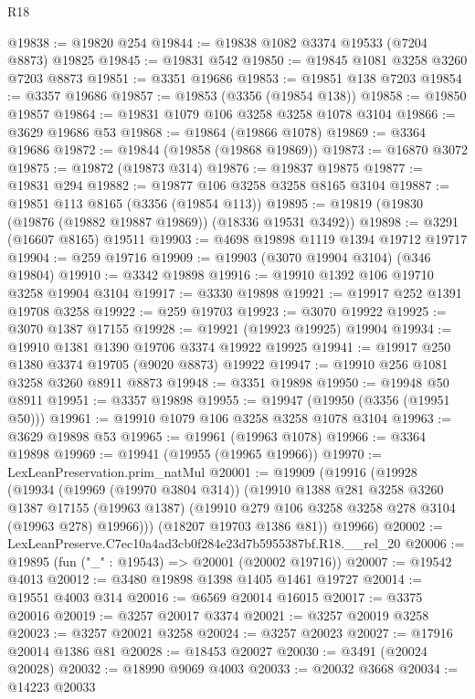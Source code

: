 \begin{lexlean}{R18}
\begin{coremodule}
@19838 := @19820 @254
@19844 := @19838 @1082 @3374 @19533 (@7204 @8873) @19825
@19845 := @19831 @542
@19850 := @19845 @1081 @3258 @3260 @7203 @8873
@19851 := @3351 @19686
@19853 := @19851 @138 @7203
@19854 := @3357 @19686
@19857 := @19853 (@3356 (@19854 @138))
@19858 := @19850 @19857
@19864 := @19831 @1079 @106 @3258 @3258 @1078 @3104
@19866 := @3629 @19686 @53
@19868 := @19864 (@19866 @1078)
@19869 := @3364 @19686
@19872 := @19844 (@19858 (@19868 @19869))
@19873 := @16870 @3072
@19875 := @19872 (@19873 @314)
@19876 := @19837 @19875
@19877 := @19831 @294
@19882 := @19877 @106 @3258 @3258 @8165 @3104
@19887 := @19851 @113 @8165 (@3356 (@19854 @113))
@19895 := @19819 (@19830 (@19876 (@19882 @19887 @19869)) (@18336 @19531 @3492))
@19898 := @3291 (@16607 @8165) @19511
@19903 := @4698 @19898 @1119 @1394 @19712 @19717
@19904 := @259 @19716
@19909 := @19903 (@3070 @19904 @3104) (@346 @19804)
@19910 := @3342 @19898
@19916 := @19910 @1392 @106 @19710 @3258 @19904 @3104
@19917 := @3330 @19898
@19921 := @19917 @252 @1391 @19708 @3258
@19922 := @259 @19703
@19923 := @3070 @19922
@19925 := @3070 @1387 @17155
@19928 := @19921 (@19923 @19925) @19904
@19934 := @19910 @1381 @1390 @19706 @3374 @19922 @19925
@19941 := @19917 @250 @1380 @3374 @19705 (@9020 @8873) @19922
@19947 := @19910 @256 @1081 @3258 @3260 @8911 @8873
@19948 := @3351 @19898
@19950 := @19948 @50 @8911
@19951 := @3357 @19898
@19955 := @19947 (@19950 (@3356 (@19951 @50)))
@19961 := @19910 @1079 @106 @3258 @3258 @1078 @3104
@19963 := @3629 @19898 @53
@19965 := @19961 (@19963 @1078)
@19966 := @3364 @19898
@19969 := @19941 (@19955 (@19965 @19966))
@19970 := LexLeanPreservation.prim_natMul
@20001 := @19909
    (@19916
      (@19928
        (@19934
          (@19969 (@19970 @3804 @314))
          (@19910
            @1388
            @281
            @3258
            @3260
            @1387
            @17155
            (@19963 @1387)
            (@19910 @279 @106 @3258 @3258 @278 @3104 (@19963 @278) @19966)))
        (@18207 @19703 @1386 @81))
      @19966)
@20002 := LexLeanPreserve.C7ec10a4ad3cb0f284e23d7b5955387bf.R18.__rel_20
@20006 := @19895 (fun ("_" : @19543) => @20001 (@20002 @19716))
@20007 := @19542 @4013
@20012 := @3480 @19898 @1398 @1405 @1461 @19727
@20014 := @19551 @4003 @314
@20016 := @6569 @20014 @16015
@20017 := @3375 @20016
@20019 := @3257 @20017 @3374
@20021 := @3257 @20019 @3258
@20023 := @3257 @20021 @3258
@20024 := @3257 @20023
@20027 := @17916 @20014 @1386 @81
@20028 := @18453 @20027
@20030 := @3491 (@20024 @20028)
@20032 := @18990 @9069 @4003
@20033 := @20032 @3668
@20034 := @14223 @20033

\end{coremodule}
\end{lexlean}
